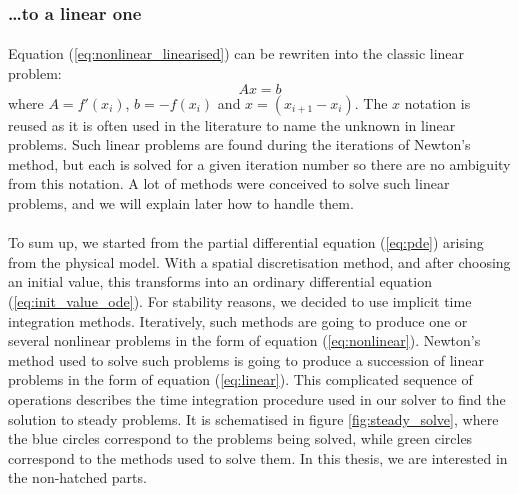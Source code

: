      \subsubsection{\dots to a linear one}

        \paragraph{}
        Equation (\ref{eq:nonlinear_linearised}) can be rewriten into the classic linear problem:
        \begin{equation}\label{eq:linear}
          Ax = b
        \end{equation}
        where $A = f'\left(x_i\right)$, $b = -f\left(x_i\right)$ and $x = \left( x_{i+1} - x_i \right)$.
        The $x$ notation is reused as it is often used in the literature to name the unknown in linear problems.
        Such linear problems are found during the iterations of Newton's method, but each is solved for a given iteration number so there are no ambiguity from this notation.
        A lot of methods were conceived to solve such linear problems, and we will explain later how to handle them.


      \paragraph{}
      To sum up, we started from the partial differential equation (\ref{eq:pde}) arising from the physical model.
      With a spatial discretisation method, and after choosing an initial value, this transforms into an ordinary differential equation (\ref{eq:init_value_ode}).
      For stability reasons, we decided to use implicit time integration methods.
      Iteratively, such methods are going to produce one or several nonlinear problems in the form of equation (\ref{eq:nonlinear}).
      Newton's method used to solve such problems is going to produce a succession of linear problems in the form of equation (\ref{eq:linear}).
      This complicated sequence of operations describes the time integration procedure used in our solver to find the solution to steady problems.
      It is schematised in figure \ref{fig:steady_solve}, where the blue circles correspond to the problems being solved, while green circles correspond to the methods used to solve them.
      In this thesis, we are interested in the non-hatched parts.

